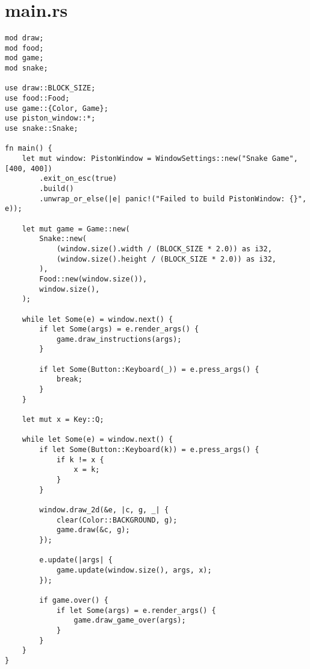 \documentclass{article}
\begin{document}
\section{main.rs}
\begin{verbatim}
mod draw;
mod food;
mod game;
mod snake;

use draw::BLOCK_SIZE;
use food::Food;
use game::{Color, Game};
use piston_window::*;
use snake::Snake;

fn main() {
    let mut window: PistonWindow = WindowSettings::new("Snake Game", [400, 400])
        .exit_on_esc(true)
        .build()
        .unwrap_or_else(|e| panic!("Failed to build PistonWindow: {}", e));

    let mut game = Game::new(
        Snake::new(
            (window.size().width / (BLOCK_SIZE * 2.0)) as i32,
            (window.size().height / (BLOCK_SIZE * 2.0)) as i32,
        ),
        Food::new(window.size()),
        window.size(),
    );

    while let Some(e) = window.next() {
        if let Some(args) = e.render_args() {
            game.draw_instructions(args);
        }

        if let Some(Button::Keyboard(_)) = e.press_args() {
            break;
        }
    }

    let mut x = Key::Q;

    while let Some(e) = window.next() {
        if let Some(Button::Keyboard(k)) = e.press_args() {
            if k != x {
                x = k;
            }
        }

        window.draw_2d(&e, |c, g, _| {
            clear(Color::BACKGROUND, g);
            game.draw(&c, g);
        });

        e.update(|args| {
            game.update(window.size(), args, x);
        });

        if game.over() {
            if let Some(args) = e.render_args() {
                game.draw_game_over(args);
            }
        }
    }
}
\end{verbatim}
\end{document}
